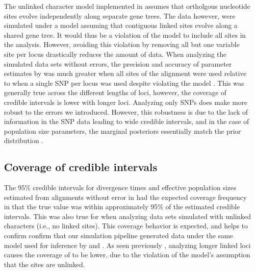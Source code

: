The unlinked character model implemented in \ecoevolity assumes that ortholgous 
nucleotide sites evolve independently along separate gene trees. The data however, were
simulated under a model assuming that contiguous linked sites evolve along a shared 
gene tree. It would thus be a violation of the \ecoevolity model to include all
sites in the analysis.
However, avoiding this violation by removing all but one variable site per
locus drastically reduces the amount of data.
When analyzing the simulated data sets without errors, the precision and accuracy of
parameter estimates by \ecoevolity was much greater
when all sites of the alignment were used relative to when a single SNP per 
locus was used despite violating the model \mainfigsp.
This was generally true across the different lengths of loci, however, the
coverage of credible intervals is lower with longer loci.
Analyzing only SNPs does make \ecoevolity more robust to the errors
we introduced.
However, this robustness is due to the lack of information in the
SNP data leading to wide credible intervals, and in the case of
population size parameters, the marginal posteriors essentially
match the prior distribution \thetafigsp.





\subsection{Coverage of credible intervals}
The 95\% credible intervals for divergence times and effective population sizes
estimated from alignments without error in \beast had the expected coverage
frequency in that the true value was within approximately 95\% of the estimated
credible intervals. 
This was also true for \ecoevolity when analyzing data sets simulated with
unlinked characters (i.e., no linked sites).
This coverage behavior is expected, and helps to confirm confirm that our
simulation pipeline generated data under the same model used for inference by
\beast and \ecoevolity. 
As seen previously \citep{Oaks2018ecoevolity}, analyzing longer linked loci
causes the coverage of \ecoevolity to be lower, due to the violation of the
model's assumption that the sites are unlinked.

